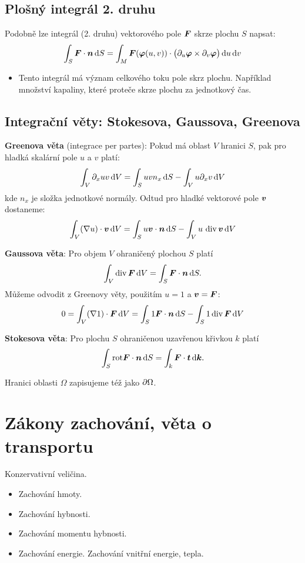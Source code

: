 \subsection{Plošný integrál 2. druhu}
Podobně lze integrál (2. druhu) vektorového pole $\mathbf{\boldsymbol{F}}$ skrze plochu $S$ napsat:
\begin{equation}
    \label{eq:surf_2_int}
  \int_S \mathbf{\boldsymbol{F}}\cdot \mathbf{\boldsymbol{n}} \,{\rm d} S = \int_M \mathbf{\boldsymbol{F}}( \mathbf{\boldsymbol{\varphi}}(u,v) ) \cdot \big( \partial_u \mathbf{\boldsymbol{\varphi}} \times \partial_v \mathbf{\boldsymbol{\varphi}}\big) \,{\rm d} u\,{\rm d} v
\end{equation}

\begin{itemize}
 \item Tento integrál má význam celkového toku pole skrz plochu. Například množství kapaliny, které proteče skrze plochu za jednotkový čas.
\end{itemize}




\subsection{Integrační věty: Stokesova, Gaussova, Greenova}

{\bf Greenova věta} (integrace per partes):
Pokud má oblast $V$ hranici $S$, pak pro hladká skalární pole $u$ a $v$ platí:
\[
        \int_V  \partial_x u  v \,{\rm d} V = \int_S u v  n_x \,{\rm d} S - \int_V u \partial_x v \,{\rm d} V
\]
kde $n_x$ je složka jednotkové normály. Odtud pro hladké vektorové pole $\mathbf{\boldsymbol{v}}$ dostaneme:
\[
        \int_V (\nabla u) \cdot \mathbf{\boldsymbol{v}} \,{\rm d} V = \int_S u \mathbf{\boldsymbol{v}} \cdot \mathbf{\boldsymbol{n}} \,{\rm d} S - \int_V u\, \operatorname{div} \mathbf{\boldsymbol{v}} \,{\rm d} V
\]

{\bf Gaussova věta}: Pro objem $V$ ohraničený plochou $S$ platí
\[
        \int_V \operatorname{div} \mathbf{\boldsymbol{F}} \,{\rm d} V = \int_S \mathbf{\boldsymbol{F}}\cdot \mathbf{\boldsymbol{n}} \,{\rm d} S.
\]
Můžeme odvodit z Greenovy věty, použitím $u=1$ a $\mathbf{\boldsymbol{v}} = \mathbf{\boldsymbol{F}}$:
\[
    0=\int_V (\nabla 1) \cdot \mathbf{\boldsymbol{F}} \,{\rm d} V  = \int_S 1\mathbf{\boldsymbol{F}} \cdot \mathbf{\boldsymbol{n}} \,{\rm d} S - \int_S 1 \operatorname{div} \mathbf{\boldsymbol{F}}  \,{\rm d} V
\]


{\bf Stokesova věta}: Pro plochu $S$ ohraničenou uzavřenou křivkou $k$ platí
\[
        \int_S {\rm rot} \mathbf{\boldsymbol{F}} \cdot \mathbf{\boldsymbol{n}} \,{\rm d} S = \int_k \mathbf{\boldsymbol{F}}\cdot \mathbf{\boldsymbol{t}} \,{\rm d} \mathbf{\boldsymbol{k}}.
\]

Hranici oblasti $\Omega$ zapisujeme též jako $\partial \Omega$. 

\section{Zákony zachování, věta o transportu}
Konzervativní veličina.
\begin{itemize}
 \item Zachování hmoty.
 \item Zachování hybnosti.
 \item Zachování momentu hybnosti.
 \item Zachování energie. Zachování vnitřní energie, tepla.
\end{itemize}

